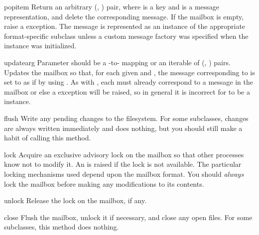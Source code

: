 \begin{methoddesc}{popitem}{}
Return an arbitrary (, ) pair, where  is a key
and  is a message representation, and delete the corresponding
message. If the mailbox is empty, raise a  exception. The
message is represented as an instance of the appropriate format-specific
 subclass unless a custom message factory was specified when the
 instance was initialized.
\end{methoddesc}

\begin{methoddesc}{update}{arg}
Parameter  should be a -to- mapping or an
iterable of (, ) pairs. Updates the mailbox so that, for
each given  and , the message corresponding to 
is set to  as if by using . As with
, each  must already correspond to a message in
the mailbox or else a  exception will be raised, so in
general it is incorrect for  to be a  instance.
\end{methoddesc}

\begin{methoddesc}{flush}{}
Write any pending changes to the filesystem. For some 
subclasses, changes are always written immediately and  does
nothing, but you should still make a habit of calling this method.
\end{methoddesc}

\begin{methoddesc}{lock}{}
Acquire an exclusive advisory lock on the mailbox so that other processes know
not to modify it. An  is raised if the lock is
not available. The particular locking mechanisms used depend upon the mailbox
format.  You should \emph{always} lock the mailbox before making any 
modifications to its contents.
\end{methoddesc}

\begin{methoddesc}{unlock}{}
Release the lock on the mailbox, if any.
\end{methoddesc}

\begin{methoddesc}{close}{}
Flush the mailbox, unlock it if necessary, and close any open files. For some
 subclasses, this method does nothing.
\end{methoddesc}



